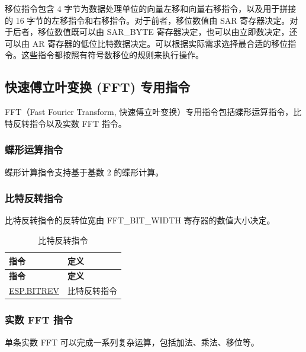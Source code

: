 \documentclass[main\_\_CN.tex]{subfiles}
\begin{document}
移位指令包含 4 字节为数据处理单位的向量左移和向量右移指令，以及用于拼接的 16 字节的左移指令和右移指令。对于前者，移位数值由 SAR 寄存器决定。对于后者，移位数值既可以由 SAR\_BYTE 寄存器决定，也可以由立即数决定，还可以由 AR 寄存器的低位比特数据决定。可以根据实际需求选择最合适的移位指令。这些指令都按照有符号数移位的规则来执行操作。




\subsection{快速傅立叶变换 (FFT) 专用指令}
\label{sec:pie-fft-instructions}

FFT（Fast Fourier Transform, 快速傅立叶变换）专用指令包括蝶形运算指令，比特反转指令以及实数 FFT 指令。

\subsubsection{蝶形运算指令}

蝶形计算指令支持基于基数 2 的蝶形计算。



\subsubsection{比特反转指令}

比特反转指令的反转位宽由 FFT\_BIT\_WIDTH 寄存器的数值大小决定。

\begin{longtable}[c]{|l|m{10cm}|}
    \caption{比特反转指令}
    \label{tab:pie-bitrev-instructions}\\
    \hline
    \rowcolor{lightgray}
    \textbf{指令} & \textbf{定义} \\\hline
    \endfirsthead
    \rowcolor{lightgray}
    \textbf{指令} & \textbf{定义} \\\hline
    \endhead
    \endfoot

    \hyperref[instruction:ESPBITREV]{ESP.BITREV} & 比特反转指令
    \\\hline
\end{longtable}

\subsubsection{实数 FFT 指令}

单条实数 FFT 可以完成一系列复杂运算，包括加法、乘法、移位等。
\end{document}
